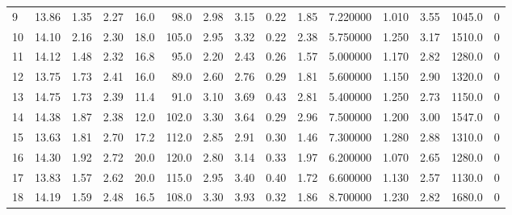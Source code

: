 \documentclass{article}
\begin{document}
\begin{tabular}{lrrrrrrrrrrrrrr}
    9   &    13.86 &        1.35 &  2.27 &               16.0 &       98.0 &           2.98 &        3.15 &                  0.22 &             1.85 &         7.220000 &  1.010 &                          3.55 &   1045.0 &      0 \\
    10  &    14.10 &        2.16 &  2.30 &               18.0 &      105.0 &           2.95 &        3.32 &                  0.22 &             2.38 &         5.750000 &  1.250 &                          3.17 &   1510.0 &      0 \\
    11  &    14.12 &        1.48 &  2.32 &               16.8 &       95.0 &           2.20 &        2.43 &                  0.26 &             1.57 &         5.000000 &  1.170 &                          2.82 &   1280.0 &      0 \\
    12  &    13.75 &        1.73 &  2.41 &               16.0 &       89.0 &           2.60 &        2.76 &                  0.29 &             1.81 &         5.600000 &  1.150 &                          2.90 &   1320.0 &      0 \\
    13  &    14.75 &        1.73 &  2.39 &               11.4 &       91.0 &           3.10 &        3.69 &                  0.43 &             2.81 &         5.400000 &  1.250 &                          2.73 &   1150.0 &      0 \\
    14  &    14.38 &        1.87 &  2.38 &               12.0 &      102.0 &           3.30 &        3.64 &                  0.29 &             2.96 &         7.500000 &  1.200 &                          3.00 &   1547.0 &      0 \\
    15  &    13.63 &        1.81 &  2.70 &               17.2 &      112.0 &           2.85 &        2.91 &                  0.30 &             1.46 &         7.300000 &  1.280 &                          2.88 &   1310.0 &      0 \\
    16  &    14.30 &        1.92 &  2.72 &               20.0 &      120.0 &           2.80 &        3.14 &                  0.33 &             1.97 &         6.200000 &  1.070 &                          2.65 &   1280.0 &      0 \\
    17  &    13.83 &        1.57 &  2.62 &               20.0 &      115.0 &           2.95 &        3.40 &                  0.40 &             1.72 &         6.600000 &  1.130 &                          2.57 &   1130.0 &      0 \\
    18  &    14.19 &        1.59 &  2.48 &               16.5 &      108.0 &           3.30 &        3.93 &                  0.32 &             1.86 &         8.700000 &  1.230 &                          2.82 &   1680.0 &      0 \\

\end{tabular}
\end{document}
